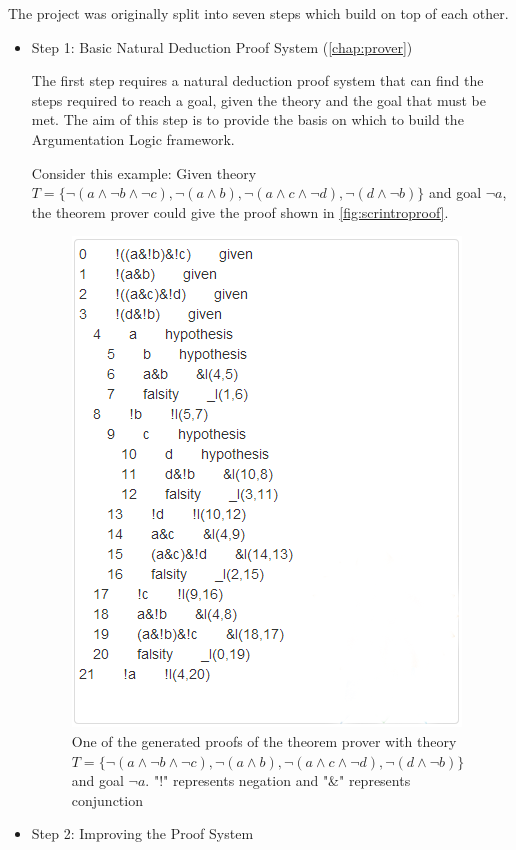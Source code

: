 \documentclass[11pt,twoside,a4paper]{report}
\begin{document}
The project was originally split into seven steps which build on top of each other.
\begin{itemize}
\item
Step 1: Basic Natural Deduction Proof System (\autoref{chap:prover})

The first step requires a natural deduction proof system that can find the steps required to reach a goal, given the theory and the goal that must be met. The aim of this step is to provide the basis on which to build the Argumentation Logic framework.

Consider this example: Given theory $T = \{\neg(a\wedge\neg b\wedge\neg c), \neg(a\wedge b), \neg(a\wedge c\wedge\neg d), \neg(d\wedge\neg b)\}$ and goal $\neg a$, the theorem prover could give the proof shown in \autoref{fig:scrintroproof}.

\begin{figure}[htp]
\centerline{\includegraphics[scale=0.4]{img/scr-intro-proof.png}}
\caption{One of the generated proofs of the theorem prover with theory $T = \{\neg(a\wedge\neg b\wedge\neg c), \neg(a\wedge b), \neg(a\wedge c\wedge\neg d), \neg(d\wedge\neg b)\}$ and goal $\neg a$. "!" represents negation and "\&" represents conjunction\label{fig:scrintroproof}}
\end{figure}
\item
Step 2: Improving the Proof System


\end{itemize}
\end{document}
